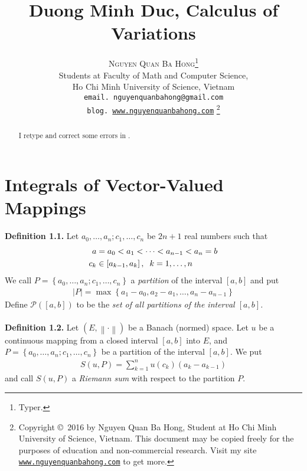 \documentclass[a4paper]{article}
\title{\huge Duong Minh Duc, Calculus of Variations}
\author{\textsc{Nguyen Quan Ba Hong}\footnote{Typer.}\\
{\small Students at Faculty of Math and Computer Science,}\\ 
{\small Ho Chi Minh University of Science, Vietnam} \\
{\small \texttt{email. nguyenquanbahong@gmail.com}}\\
{\small \texttt{blog. \url{www.nguyenquanbahong.com}} 
\footnote{Copyright \copyright\ 2016 by Nguyen Quan Ba Hong, Student at Ho Chi Minh University of Science, Vietnam. This document may be copied freely for the purposes of education and non-commercial research. Visit my site \texttt{\url{www.nguyenquanbahong.com}} to get more.}}}
\numberwithin{equation}{section}
\begin{document}
\maketitle
\begin{abstract}
I retype and correct some errors in \cite{1}.
\end{abstract}
\newpage
\tableofcontents
\newpage
\section{Integrals of Vector-Valued Mappings}
\textbf{Definition 1.1.} Let $a_0,\ldots,a_n;c_1,\ldots,c_n$ be $2n+1$ real numbers such that
\begin{align}
a &= {a_0} < {a_1} <  \cdots  < {a_{n - 1}} < {a_n} = b\\
{c_k} &\in \left[ {{a_{k - 1}},{a_k}} \right],\hspace{0.2cm} k = 1, \ldots ,n
\end{align}
We call $P = \left\{ {{a_0}, \ldots ,{a_n};{c_1}, \ldots ,{c_n}} \right\}$ a \textit{partition} of the interval $\left[a,b\right]$ and put
\begin{align}
\left| P \right| = \max \left\{ {{a_1} - {a_0},{a_2} - {a_1}, \ldots ,{a_n} - {a_{n - 1}}} \right\}
\end{align}
Define $\mathcal{P}\left(\left[a,b\right]\right)$ to be the \textit{set of all partitions of the interval $\left[a,b\right]$.}\\
\\
\textbf{Definition 1.2.} Let $\left( {E,\left\|  \cdot  \right\|} \right)$ be a Banach (normed) space. Let $u$ be a continuous mapping from a closed interval $\left[a,b\right]$ into $E$, and $P = \left\{ {{a_0}, \ldots ,{a_n};{c_1}, \ldots ,{c_n}} \right\}$ be a partition of the interval $\left[a,b\right]$. We put
\begin{align}
S\left( {u,P} \right) = \sum\limits_{k = 1}^n {u\left( {{c_k}} \right)\left( {{a_k} - {a_{k - 1}}} \right)} 
\end{align}
and call $S\left(u,P\right)$ a \textit{Riemann sum} with respect to the partition $P$.
\end{document}
